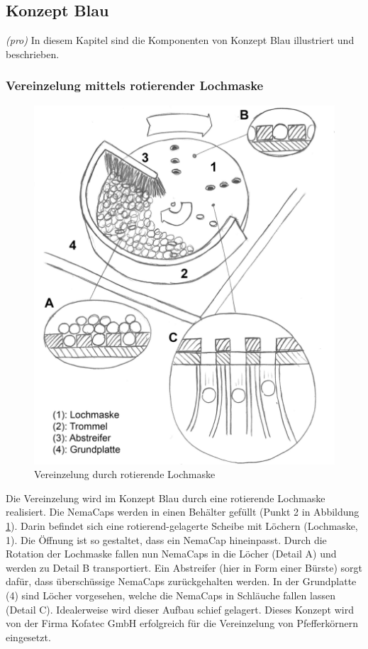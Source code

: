 \newpage
\subsection{Konzept Blau}
\textit{(pro)} In diesem Kapitel sind die Komponenten von Konzept Blau illustriert und beschrieben.


\subsubsection{Vereinzelung mittels rotierender Lochmaske}
\begin{figure}
	\includegraphics[scale=0.52]{Illustrationen/5-Konzept/schema_vereinzelung.jpg}
	\caption{Vereinzelung durch rotierende Lochmaske}
	\label{fig:schema_vereinzelung}
\end{figure}
Die Vereinzelung wird im Konzept  Blau durch eine rotierende Lochmaske realisiert. Die NemaCaps werden in einen Behälter gefüllt (Punkt 2 in Abbildung \ref{fig:schema_vereinzelung}). Darin befindet sich eine rotierend-gelagerte Scheibe mit Löchern (Lochmaske, 1). Die Öffnung ist so gestaltet, dass ein NemaCap hineinpasst. Durch die Rotation der Lochmaske fallen nun NemaCaps in die Löcher (Detail A) und werden zu Detail B transportiert. Ein Abstreifer (hier in Form einer Bürste) sorgt dafür, dass überschüssige NemaCaps zurückgehalten werden. In der Grundplatte (4) sind Löcher vorgesehen, welche die NemaCaps in Schläuche fallen lassen (Detail C). Idealerweise wird dieser Aufbau schief gelagert. 
\newline
Dieses Konzept wird von der Firma Kofatec GmbH erfolgreich für die Vereinzelung von Pfefferkörnern eingesetzt. 

